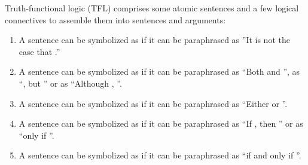 \begin{definition}
  Truth-functional logic (TFL) comprises some atomic sentences and a few logical
  connectives to assemble them into sentences and arguments:
  \begin{enumerate}
  \item A sentence can be symbolized as \enot\sphi if it can be paraphrased as
    ''It is not the case that \ephi.''
  \item A sentence can be symbolized as \ephi\eand\spsi if it can be paraphrased
    as ``Both \sphi and \epsi'', as ``\ephi, but \epsi'' or as ``Although
    \ephi, \epsi''.
  \item A sentence can be symbolized as \ephi\eor\spsi if it can be paraphrased
    as ``Either \sphi or \epsi''.
  \item A sentence can be symbolized as \ephi\eif\spsi if it can be paraphrased
    as ``If \sphi, then \epsi'' or as ``\spsi only if \ephi''.
  \item A sentence can be symbolized as \ephi\eiff\spsi if it can be paraphrased
    as ``\sphi if and only if \epsi''.
  \end{enumerate}
\end{definition}
  

  
